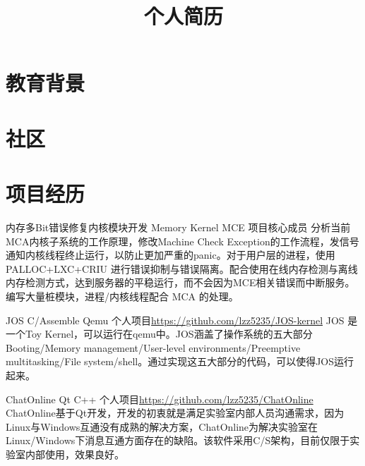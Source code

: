 \documentclass[11pt,a4paper]{moderncv}
\title{个人简历}                      %
\begin{document}
\maketitle

\section{教育背景}


\section{社区}

\section{项目经历}
\renewcommand{\baselinestretch}{1.2}

{内存多Bit错误修复内核模块开发}
{Memory Kernel MCE}
{}{项目核心成员}
{分析当前MCA内核子系统的工作原理，修改Machine Check Exception的工作流程，发信号通知内核线程终止运行，以防止更加严重的panic。对于用户层的进程，使用PALLOC+LXC+CRIU 进行错误抑制与错误隔离。配合使用在线内存检测与离线内存检测方式，达到服务器的平稳运行，而不会因为MCE相关错误而中断服务。编写大量桩模块，进程/内核线程配合 MCA 的处理。}

{JOS}
{C/Assemble Qemu}
{个人项目}{\url{https://github.com/lzz5235/JOS-kernel}}
{JOS 是一个Toy Kernel，可以运行在qemu中。JOS涵盖了操作系统的五大部分Booting/Memory management/User-level environments/Preemptive multitasking/File system/shell。通过实现这五大部分的代码，可以使得JOS运行起来。}

{ChatOnline}
{Qt C++}
{个人项目}{\url{https://github.com/lzz5235/ChatOnline}}
{ChatOnline基于Qt开发，开发的初衷就是满足实验室内部人员沟通需求，因为Linux与Windows互通没有成熟的解决方案，ChatOnline为解决实验室在Linux/Windows下消息互通方面存在的缺陷。该软件采用C/S架构，目前仅限于实验室内部使用，效果良好。}
\end{document}

